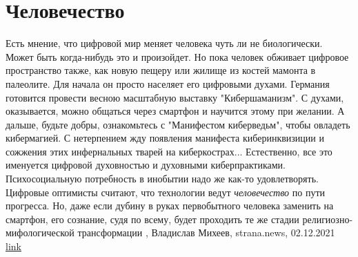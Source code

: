  
 
 
 
 
\chapter{Человечество}

Есть мнение, что цифровой мир меняет человека чуть ли не биологически. Может
быть когда-нибудь это и произойдет. Но пока человек обживает цифровое
пространство также, как новую пещеру или жилище из костей мамонта в палеолите.
Для начала он просто населяет его цифровыми духами. Германия готовится провести
весною масштабную выставку "Кибершаманизм". С духами, оказывается, можно
общаться через смартфон и научится этому при желании. А дальше, будьте добры,
ознакомьтесь с "Манифестом киберведьм", чтобы овладеть кибермагией.  С
нетерпением жду появления манифеста киберинквизиции и сожжения этих
инфернальных тварей на киберкострах...  Естественно, все это именуется цифровой
духовностью и духовными киберпрактиками. Психосоциальную потребность в инобытии
надо же как-то удовлетворять.  Цифровые оптимисты считают, что технологии ведут
\emph{человечество} по пути прогресса. Но, даже если дубину в руках первобытного
человека заменить на смартфон, его сознание, судя по всему, будет проходить те
же стадии религиозно- мифологической трансформации
, 
Владислав Михеев, strana.news, 02.12.2021
\href{https://strana.news/opinions/365165-mir-pohruzhaetsja-v-tsifrovuju-mahiju-i-mistiku.html}{link}
